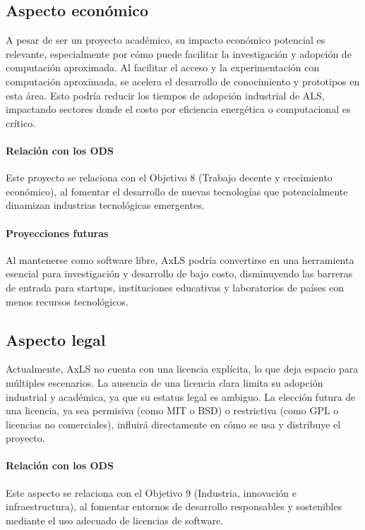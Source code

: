 \subsection{Aspecto económico}

A pesar de ser un proyecto académico, su impacto económico potencial es
relevante, especialmente por cómo puede facilitar la investigación y adopción
de computación aproximada. Al facilitar el acceso y la experimentación con
computación aproximada, se acelera el desarrollo de conocimiento y prototipos
en esta área. Esto podría reducir los tiempos de adopción industrial de ALS,
impactando sectores donde el costo por eficiencia energética o computacional es
crítico.

\paragraph{Relación con los ODS}
Este proyecto se relaciona con el Objetivo 8 (Trabajo decente y crecimiento
económico), al fomentar el desarrollo de nuevas tecnologías que potencialmente
dinamizan industrias tecnológicas emergentes.

\paragraph{Proyecciones futuras}
Al mantenerse como software libre, AxLS podría convertirse en una herramienta
esencial para investigación y desarrollo de bajo costo, disminuyendo las
barreras de entrada para startups, instituciones educativas y laboratorios de
países con menos recursos tecnológicos.

\subsection{Aspecto legal}

Actualmente, AxLS no cuenta con una licencia explícita, lo que deja espacio
para múltiples escenarios. La ausencia de una licencia clara limita su adopción
industrial y académica, ya que su estatus legal es ambiguo. La elección futura
de una licencia, ya sea permisiva (como MIT o BSD) o restrictiva (como GPL o
licencias no comerciales), influirá directamente en cómo se usa y distribuye el
proyecto.

\paragraph{Relación con los ODS}
Este aspecto se relaciona con el Objetivo 9 (Industria, innovación e
infraestructura), al fomentar entornos de desarrollo responsables y sostenibles
mediante el uso adecuado de licencias de software.

